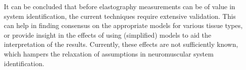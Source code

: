 It can be concluded that before elastography measurements can be of value in system identification, the current techniques require extensive validation. This can help in finding consensus on the appropriate models for various tissue types, or provide insight in the effects of using (simplified) models to aid the interpretation of the results. Currently, these effects are not sufficiently known, which hampers the relaxation of assumptions in neuromuscular system identification. 


%
%
%
%
%


















